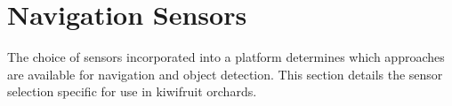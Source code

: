 \documentclass[preprint,authoryear,12pt]{elsarticle}
\begin{document}
\section{Navigation Sensors}
\label{sect:sensors}
    The choice of sensors incorporated into a platform determines which approaches are available for navigation and object detection.
    This section details the sensor selection specific for use in kiwifruit orchards.

\end{document}
